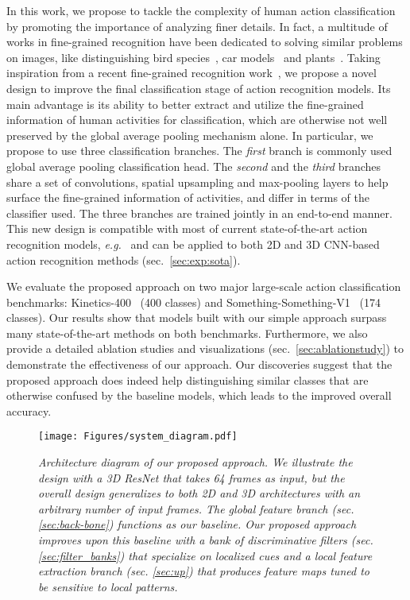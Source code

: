 \documentclass[10pt,twocolumn,letterpaper]{article}
\begin{document}
In this work, we propose to tackle the complexity of human action classification by promoting the importance of analyzing finer details.
In fact, a multitude of works in fine-grained recognition have been dedicated to solving similar problems on images, like distinguishing bird species~\cite{Welinder2010CUB}, car models~\cite{yang2015CompCar,Kraus2013Car} and plants~\cite{Horn2017INaturalist}.
Taking inspiration from a recent fine-grained recognition work~\cite{DiscriminativeFilterBank_CVPR18}, we propose a novel design to improve the final classification stage of action recognition models. Its main advantage is its ability to better extract and utilize the fine-grained information of human activities for classification, which are otherwise not well preserved by the global average pooling mechanism alone.
In particular, we propose to use three classification branches. The {\it first} branch is commonly used global average pooling classification head. The {\it second} and the {\it third} branches share a set of convolutions, spatial upsampling and max-pooling layers to help surface the fine-grained information of activities, and differ in terms of the classifier used. The three branches are trained jointly in an end-to-end manner. This new design is compatible with most of current state-of-the-art action recognition models, \emph{e.g.}~\cite{NonLocalNN_CVPR18,Trajectory_NIPS18} and can be applied to both 2D and 3D CNN-based action recognition methods (sec.~\ref{sec:exp:sota}).



We evaluate the proposed approach on two major large-scale action classification benchmarks: Kinetics-400~\cite{Kinetics} (400 classes) and Something-Something-V1~\cite{Something_Something_ICCV17} (174 classes).
Our results show that models built with our simple approach surpass many state-of-the-art methods on both benchmarks.
Furthermore, we also provide a detailed ablation studies and visualizations (sec.~\ref{sec:ablationstudy}) to demonstrate the effectiveness of our approach. Our discoveries suggest that the proposed approach does indeed help distinguishing similar classes that are otherwise confused by the baseline models, which leads to the improved overall accuracy.







\begin{figure*}
    \texttt{[image: Figures/system\_diagram.pdf]}
    \caption{ \it Architecture diagram of our proposed approach. We illustrate the design with a 3D ResNet that takes 64 frames as input, but the overall design generalizes to both 2D and 3D architectures with an arbitrary number of input frames. The global feature branch (sec. \ref{sec:back-bone}) functions as our baseline. Our proposed approach improves upon this baseline with a bank of discriminative filters (sec. \ref{sec:filter_banks}) that specialize on localized cues and a local feature extraction branch (sec. \ref{sec:up}) that produces feature maps tuned to be sensitive to local patterns.}
    \vspace{-2mm}
    \label{fig:system}
\end{figure*}
\end{document}
